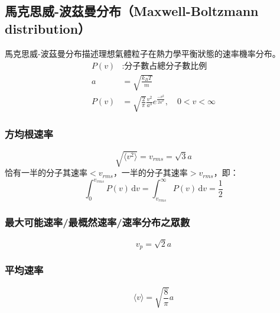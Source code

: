 \documentclass[a4paper,12pt]{report}
\begin{document}
\subsection{馬克思威-波茲曼分布（Maxwell-Boltzmann distribution）}
馬克思威-波茲曼分布描述理想氣體粒子在熱力學平衡狀態的速率機率分布。
\[\begin{aligned}
P(v)&: \text{分子數占總分子數比例}\\
a &= \sqrt{\frac{k_BT}{m}}\\
P(v) &= \sqrt{\frac{2}{\pi}}\frac{v^2}{a^3}e^{\frac{-v^2}{2a^2}},\quad 0<v<\infty
\end{aligned}\]
\subsubsection{方均根速率}
\[\sqrt{\langle v^2 \rangle}=v_{rms} = \sqrt{3}a\]
恰有一半的分子其速率$< v_{rms}$，一半的分子其速率$> v_{rms}$，即：
\[\int_0^{v_{rms}} P(v) \,\mathrm{d}v = \int_{v_{rms}}^{\infty} P(v) \,\mathrm{d}v = \frac{1}{2}\]
\subsubsection{最大可能速率/最概然速率/速率分布之眾數}
\[v_p = \sqrt{2}a\]
\subsubsection{平均速率}
\[\langle v \rangle = \sqrt{\frac{8}{\pi}}a\]
\end{document}

